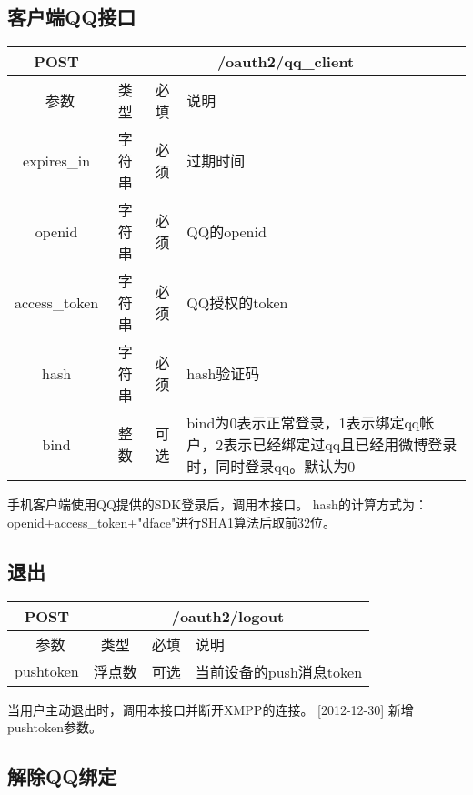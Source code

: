 \subsection{客户端QQ接口}
\label{hash_algorithm}

\begin{table}[H]
   \begin{center}
\begin{tabular}{|c|c|c|p{12cm}|}
\hline
POST & \multicolumn{3}{|c|}{/oauth2/qq\_client} \\
\hline\hline
 \  参数  & 类型 & 必填 &  说明  \\
 \hline
 expires\_in  & 字符串 & 必须 &  过期时间\\
  \hline
 openid  & 字符串 & 必须 &  QQ的openid\\
  \hline
 access\_token  & 字符串 & 必须 &  QQ授权的token\\
 \hline
 hash  & 字符串 & 必须 &  hash验证码\\
 \hline
 bind  & 整数 & 可选 &  bind为0表示正常登录，1表示绑定qq帐户，2表示已经绑定过qq且已经用微博登录时，同时登录qq。默认为0\\

\hline
\end{tabular}
   \end{center}
\end{table}
手机客户端使用QQ提供的SDK登录后，调用本接口。
hash的计算方式为：openid+access\_token+"dface"进行SHA1算法后取前32位。


\subsection{退出}

\begin{table}[H]
   \begin{center}
\begin{tabular}{|c|c|c|p{12cm}|}
\hline
POST & \multicolumn{3}{|c|}{/oauth2/logout} \\
\hline\hline
 \  参数  & 类型 & 必填 &  说明  \\
\hline
    pushtoken  & 浮点数 & 可选 &  当前设备的push消息token\\
\hline
\end{tabular}
   \end{center}
\end{table}

当用户主动退出时，调用本接口并断开XMPP的连接。
[2012-12-30] 新增pushtoken参数。


\subsection{解除QQ绑定}

